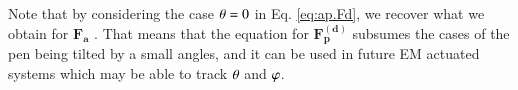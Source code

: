     Note that by considering the case $\theta = 0$ in Eq. \ref{eq:ap.Fd}, we recover what we obtain  for $\mathbf{F_a}$ . 
    That means that the equation for $\mathbf{F_{p}^{(d)}}$ subsumes the cases of the pen being tilted by a small angles, and it can be used in future EM actuated systems which may be able to track $\theta$ and $\varphi$.